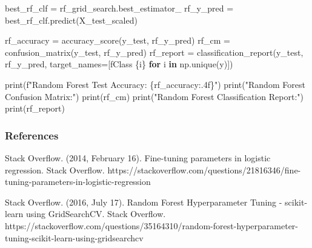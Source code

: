\documentclass[
  11pt,
  letterpaper,
  DIV=11,
  numbers=noendperiod]{scrartcl}
\newenvironment{Shaded}{\begin{snugshade}}{\end{snugshade}}
\newcommand{\BuiltInTok}[1]{\textcolor[rgb]{0.00,0.23,0.31}{#1}}
\newcommand{\ControlFlowTok}[1]{\textcolor[rgb]{0.00,0.23,0.31}{\textbf{#1}}}
\newcommand{\KeywordTok}[1]{\textcolor[rgb]{0.00,0.23,0.31}{\textbf{#1}}}
\newcommand{\NormalTok}[1]{\textcolor[rgb]{0.00,0.23,0.31}{#1}}
\newcommand{\OperatorTok}[1]{\textcolor[rgb]{0.37,0.37,0.37}{#1}}
\newcommand{\SpecialCharTok}[1]{\textcolor[rgb]{0.37,0.37,0.37}{#1}}
\newcommand{\SpecialStringTok}[1]{\textcolor[rgb]{0.13,0.47,0.30}{#1}}
\newcommand{\StringTok}[1]{\textcolor[rgb]{0.13,0.47,0.30}{#1}}
\begin{document}
\begin{Shaded}
\begin{Highlighting}[]
\NormalTok{best\_rf\_clf }\OperatorTok{=}\NormalTok{ rf\_grid\_search.best\_estimator\_}
\NormalTok{rf\_y\_pred }\OperatorTok{=}\NormalTok{ best\_rf\_clf.predict(X\_test\_scaled)}

\NormalTok{rf\_accuracy }\OperatorTok{=}\NormalTok{ accuracy\_score(y\_test, rf\_y\_pred)}
\NormalTok{rf\_cm }\OperatorTok{=}\NormalTok{ confusion\_matrix(y\_test, rf\_y\_pred)}
\NormalTok{rf\_report }\OperatorTok{=}\NormalTok{ classification\_report(y\_test, rf\_y\_pred, target\_names}\OperatorTok{=}\NormalTok{[}\SpecialStringTok{f\textquotesingle{}Class }\SpecialCharTok{\{}\NormalTok{i}\SpecialCharTok{\}}\SpecialStringTok{\textquotesingle{}} \ControlFlowTok{for}\NormalTok{ i }\KeywordTok{in}\NormalTok{ np.unique(y)])}

\BuiltInTok{print}\NormalTok{(}\SpecialStringTok{f"Random Forest Test Accuracy: }\SpecialCharTok{\{}\NormalTok{rf\_accuracy}\SpecialCharTok{:.4f\}}\SpecialStringTok{"}\NormalTok{)}
\BuiltInTok{print}\NormalTok{(}\StringTok{"Random Forest Confusion Matrix:"}\NormalTok{)}
\BuiltInTok{print}\NormalTok{(rf\_cm)}
\BuiltInTok{print}\NormalTok{(}\StringTok{"Random Forest Classification Report:"}\NormalTok{)}
\BuiltInTok{print}\NormalTok{(rf\_report)}
\end{Highlighting}
\end{Shaded}

\newpage

\subsubsection{References}\label{references}

Stack Overflow. (2014, February 16). Fine-tuning parameters in logistic
regression. Stack Overflow.
https://stackoverflow.com/questions/21816346/fine-tuning-parameters-in-logistic-regression

Stack Overflow. (2016, July 17). Random Forest Hyperparameter Tuning -
scikit-learn using GridSearchCV. Stack Overflow.
https://stackoverflow.com/questions/35164310/random-forest-hyperparameter-tuning-scikit-learn-using-gridsearchcv
\end{document}

